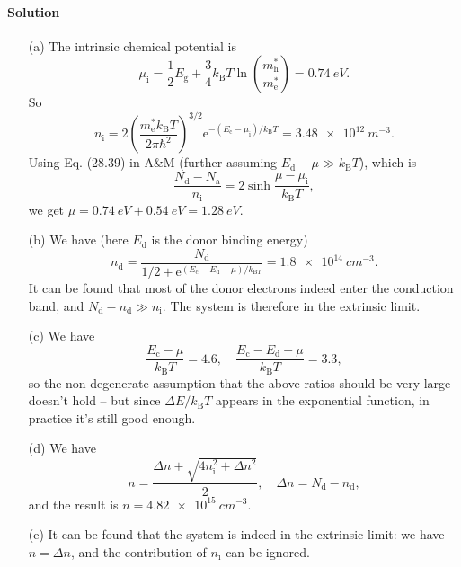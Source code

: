 \documentclass[hyperref, a4paper]{article}
\newcommand*{\ee}{\mathrm{e}}
\begin{document}
\paragraph{Solution} \begin{itemize}
\item[(a)] The intrinsic chemical potential is 
\begin{equation}
    \mu_{\text{i}} = \frac{1}{2} E_{\text{g}} + \frac{3}{4} k_{\text{B}} T \ln(\frac{m^*_{\text{h}} }{m^*_{\text{e}}}) = \SI{0.74}{eV}.
\end{equation}
So 
\begin{equation}
    n_{\text{i}} = 2 \left( \frac{m_\text{e}^* k_{\text{B}} T}{2 \pi \hbar^2} \right)^{3/2} 
    \ee^{- (E_{\text{c}} - \mu_{\text{i}}) / k_{\text{B}} T} 
    = \SI{3.48e12}{m^{-3}}.
\end{equation}
Using Eq. (28.39) in A\&M (further assuming $E_{\text{d}} - \mu \gg k_{\text{B}} T$), which is 
\begin{equation}
    \frac{N_\text{d} - N_\text{a}}{n_\text{i}} = 2 \sinh \frac{\mu - \mu_{\text{i}}}{k_{\text{B}} T},
    \label{eq:quick-mu}
\end{equation}
we get $\mu = \SI{0.74}{eV} + \SI{0.54}{eV} = \SI{1.28}{eV}$.

\item[(b)] We have (here $E_{\text{d}}$ is the donor binding energy)
\begin{equation}
    n_{\text{d}} = \frac{N_{\text{d}}}{1/2 + \ee^{(E_{\text{c}} - E_{\text{d}} - \mu) / k_{\text{B} T}}}
    = \SI{1.8e14}{cm^{-3}}.
\end{equation}
It can be found that most of the donor electrons indeed enter the conduction band,
and $N_{\text{d}} - n_{\text{d}} \gg n_{\text{i}}$.
The system is therefore in the extrinsic limit.

\item[(c)] We have 
\[
    \frac{E_{\text{c}} - \mu}{k_{\text{B}} T} = 4.6, \quad 
    \frac{E_{\text{c}} - E_{\text{d}} - \mu}{k_{\text{B}} T} = 3.3,
\]
so the non-degenerate assumption that the above ratios should be very large 
doesn't hold -- but since $\Delta E / k_{\text{B}} T$ appears in the exponential function,
in practice it's still good enough.

\item[(d)] We have 
\begin{equation}
    n = \frac{\Delta n + \sqrt{ 4 n_{\text{i}}^2 + \Delta n^2 }}{2}, 
    \quad \Delta n = N_{\text{d}} - n_{\text{d}},
\end{equation}
and the result is $n = \SI{4.82e15}{cm^{-3}}$.

\item[(e)] It can be found that the system is indeed in the extrinsic limit:
we have $n = \Delta n$, 
and the contribution of $n_{\text{i}}$ can be ignored.

\end{itemize}
\end{document}
